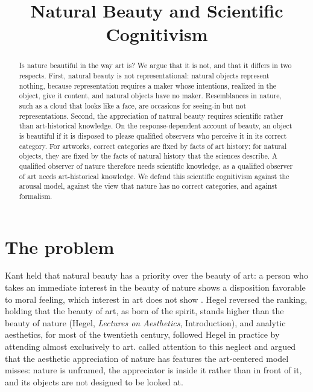 \documentclass{situationist-preprint}
\title{Natural Beauty and Scientific Cognitivism}
\begin{document}
\maketitle

\begin{abstract}
Is nature beautiful in the way art is? We argue that it is not, and that it differs in two respects. First, natural beauty is not representational: natural objects represent nothing, because representation requires a maker whose intentions, realized in the object, give it content, and natural objects have no maker. Resemblances in nature, such as a cloud that looks like a face, are occasions for seeing-in but not representations. Second, the appreciation of natural beauty requires scientific rather than art-historical knowledge. On the response-dependent account of beauty, an object is beautiful if it is disposed to please qualified observers who perceive it in its correct category. For artworks, correct categories are fixed by facts of art history; for natural objects, they are fixed by the facts of natural history that the sciences describe. A qualified observer of nature therefore needs scientific knowledge, as a qualified observer of art needs art-historical knowledge. We defend this scientific cognitivism against the arousal model, against the view that nature has no correct categories, and against formalism.
\end{abstract}

\section{The problem}

Kant held that natural beauty has a priority over the beauty of art: a person who takes an immediate interest in the beauty of nature shows a disposition favorable to moral feeling, which interest in art does not show \citep[§42]{Kant1790}. Hegel reversed the ranking, holding that the beauty of art, as born of the spirit, stands higher than the beauty of nature (Hegel, \emph{Lectures on Aesthetics}, Introduction), and analytic aesthetics, for most of the twentieth century, followed Hegel in practice by attending almost exclusively to art. \citet{Hepburn1966} called attention to this neglect and argued that the aesthetic appreciation of nature has features the art-centered model misses: nature is unframed, the appreciator is inside it rather than in front of it, and its objects are not designed to be looked at.
\end{document}
